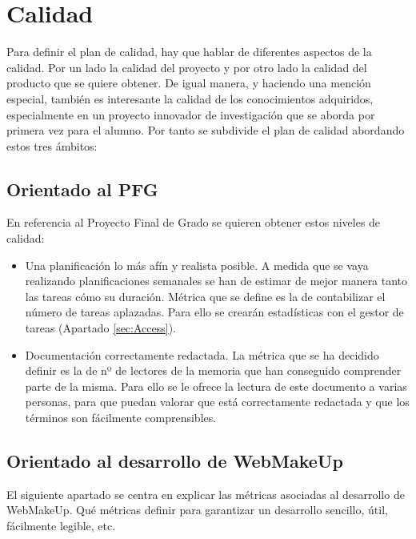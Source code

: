\section{Calidad}
\label{sec:Calidad}

Para definir el plan de calidad, hay que hablar de diferentes aspectos de la calidad. Por un lado la calidad del proyecto y por otro lado la calidad del producto que se quiere obtener. De igual manera, y haciendo una mención especial, también es interesante la calidad de los conocimientos adquiridos, especialmente en un proyecto innovador de investigación que se aborda por primera vez para el alumno. Por tanto se subdivide el plan de calidad abordando estos tres ámbitos:

\subsection{Orientado al PFG}
En referencia al Proyecto Final de Grado se quieren obtener estos niveles de calidad:
\begin{itemize}
\item{Una planificación lo más afín y realista posible. A medida que se vaya realizando planificaciones semanales se han de estimar de mejor manera tanto las tareas cómo su duración. Métrica que se define es la de contabilizar el número de tareas aplazadas. Para ello se crearán estadísticas con el gestor de tareas (Apartado \ref{sec:Access}).}
\item{Documentación correctamente redactada. La métrica que se ha decidido definir es la de nº de lectores de la memoria que han conseguido comprender parte de la misma. Para ello se le ofrece la lectura de este documento a varias personas, para que puedan valorar que está correctamente redactada y que los términos son fácilmente comprensibles.}
\end{itemize}

\subsection{Orientado al desarrollo de WebMakeUp}

El siguiente apartado se centra en explicar las métricas asociadas al desarrollo de WebMakeUp. Qué métricas definir para garantizar un desarrollo sencillo, útil, fácilmente legible, etc.

